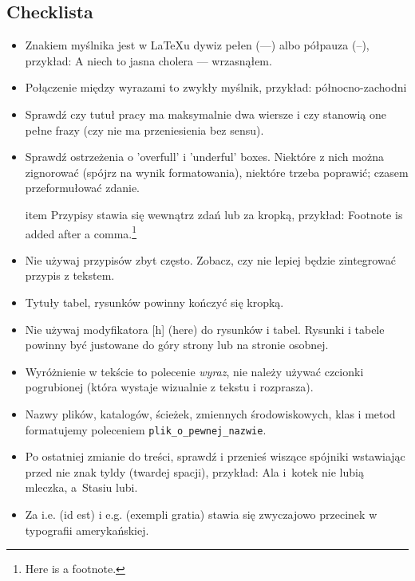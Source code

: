 \subsection{Checklista}

\begin{itemize}
\item Znakiem myślnika jest w LaTeXu dywiz pełen (---) albo półpauza (--), przykład:
  A niech to jasna cholera --- wrzasnąłem.

\item Połączenie między wyrazami to zwykły myślnik, przykład:   północno-zachodni

\item Sprawdź czy tutuł pracy ma maksymalnie dwa wiersze i czy stanowią one pełne frazy
  (czy nie ma przeniesienia bez sensu).

\item Sprawdź ostrzeżenia o 'overfull' i 'underful' boxes. Niektóre z nich można zignorować (spójrz
  na wynik formatowania), niektóre trzeba poprawić; czasem przeformułować zdanie.

item Przypisy stawia się wewnątrz zdań lub za kropką, przykład:
  Footnote is added after a comma.\footnote{Here is a footnote.}

\item Nie używaj przypisów zbyt często. Zobacz, czy nie lepiej będzie zintegrować przypis z tekstem.

\item Tytuły tabel, rysunków powinny kończyć się kropką.

\item Nie używaj modyfikatora [h] (here) do rysunków i tabel. Rysunki i tabele powinny być
  justowane do góry strony lub na stronie osobnej.

\item Wyróżnienie w tekście to polecenie \emph{wyraz}, nie należy używać czcionki pogrubionej (która
  wystaje wizualnie z tekstu i rozprasza).

\item Nazwy plików, katalogów, ścieżek, zmiennych środowiskowych, klas i metod formatujemy poleceniem
  \texttt{plik\_o\_pewnej\_nazwie}.

\item Po ostatniej zmianie do treści, sprawdź i przenieś wiszące spójniki wstawiając przed nie znak
  tyldy (twardej spacji), przykład:
  Ala i~kotek nie lubią mleczka, a~Stasiu lubi.
  
\item Za i.e. (id est) i e.g. (exempli gratia) stawia się zwyczajowo przecinek w typografii amerykańskiej.


\end{itemize}
